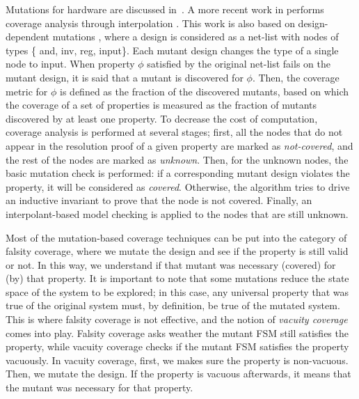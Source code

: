 \newcommand{\andnode}{{\sc and}}
\newcommand{\invnode}{{\sc inv}}
\newcommand{\inpnode}{{\sc inp}}
\newcommand{\regnode}{{\sc reg}}
\newcommand{\mutnode}{{\sc mut}}
\newcommand{\inputnode}{{\sc input}}

Mutations for hardware are discussed in~\cite{chockler2010coverage,Kupferman:2006:SCF,kupferman_theory_2008}. A more recent work in \cite{chockler2010coverage} performs coverage analysis through interpolation \cite{mcmillan2003interpolation}. This work is also based on design-dependent mutations \cite{chockler_coverage_2003}, where a design is considered as a net-list with nodes of types \{ \andnode, \invnode, \regnode, \inputnode \}.
Each mutant design changes the type of a single node to \inputnode . When property $\phi$ satisfied by the original net-list fails on the mutant design, it is said that a mutant is discovered for $\phi$.
Then, the coverage metric for $\phi$ is defined as the fraction of the discovered mutants, based on which the coverage of a set of properties is measured as the fraction of mutants discovered by at least one property.
To decrease the cost of computation, coverage analysis is performed at several stages; first, all the nodes that do not appear in the resolution proof of a given property are marked as \emph{not-covered}, and the rest of the nodes are marked as \emph{unknown}. Then, for the unknown nodes, the basic mutation check is performed: if a corresponding mutant design violates the property, it will be considered as \emph{covered}. Otherwise, the algorithm tries to drive an inductive invariant to prove that the node is not covered. Finally, an interpolant-based model checking is applied to the nodes that are still unknown.

Most of the mutation-based coverage techniques can be put into the category of falsity coverage, where we mutate the design and see if the property is still valid or not.
In this way, we understand if that mutant was necessary (covered) for (by) that property. 
It is important to note that some mutations reduce the state space of the system to
be explored; in this case, any universal property that was true of the original system
must, by definition, be true of the mutated system. This is where falsity coverage is not effective, and the notion of \emph{vacuity coverage} comes into play. Falsity coverage asks weather the mutant FSM still satisfies the property, while vacuity coverage checks if the mutant FSM satisfies the property vacuously. In vacuity coverage, first, we makes sure the property is non-vacuous. Then, we mutate the design. If the property is
vacuous afterwards, it means that the mutant was necessary for that property.



